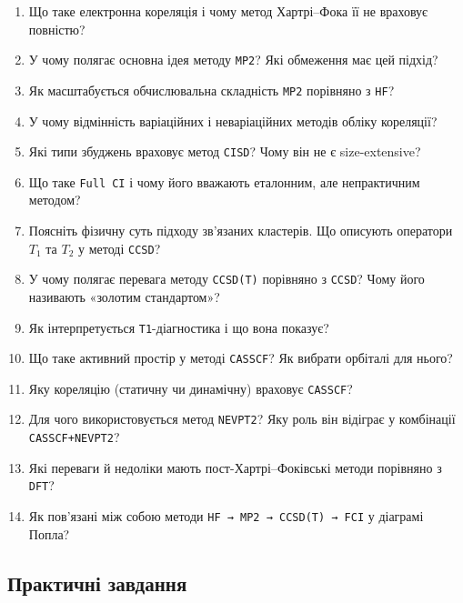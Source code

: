 \begin{enumerate}
    \item Що таке електронна кореляція і чому метод Хартрі–Фока її не враховує повністю?
    \item У чому полягає основна ідея методу \texttt{MP2}? Які обмеження має цей підхід?
    \item Як масштабується обчислювальна складність \texttt{MP2} порівняно з \texttt{HF}?
    \item У чому відмінність варіаційних і неваріаційних методів обліку кореляції?
    \item Які типи збуджень враховує метод \texttt{CISD}? Чому він не є size-extensive?
    \item Що таке \texttt{Full CI} і чому його вважають еталонним, але непрактичним методом?
    \item Поясніть фізичну суть підходу зв’язаних кластерів. Що описують оператори $T_1$ та $T_2$ у методі \texttt{CCSD}?
    \item У чому полягає перевага методу \texttt{CCSD(T)} порівняно з \texttt{CCSD}? Чому його називають «золотим стандартом»?
    \item Як інтерпретується \texttt{T1}-діагностика і що вона показує?
    \item Що таке активний простір у методі \texttt{CASSCF}? Як вибрати орбіталі для нього?
    \item Яку кореляцію (статичну чи динамічну) враховує \texttt{CASSCF}?
    \item Для чого використовується метод \texttt{NEVPT2}? Яку роль він відіграє у комбінації \texttt{CASSCF+NEVPT2}?
    \item Які переваги й недоліки мають пост-Хартрі–Фоківські методи порівняно з \texttt{DFT}?
    \item Як пов’язані між собою методи \texttt{HF → MP2 → CCSD(T) → FCI} у діаграмі Попла?
\end{enumerate}


\subsection*{Практичні завдання}

